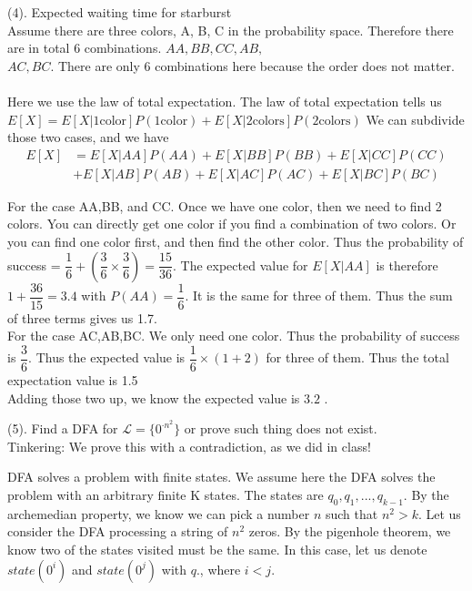 \documentclass{article}
\begin{document}
	\noindent (4). Expected waiting time for starburst\\
	Assume there are three colors, A, B, C in the probability space. Therefore there are in total 6 combinations. $AA,BB,CC,AB,$\\$AC,BC$. There are only 6 combinations here because the order does not matter.\\\\
	Here we use the law of total expectation. The law of total expectation tells us\\ $E[X] = E[X|\text{1color}]P(\text{1color})+E[X|\text{2colors}]P(\text{2colors})$
	We can subdivide those two cases, and we have
	\begin{align*}
		E[X] &= E[X|AA]P(AA)+E[X|BB]P(BB)+E[X|CC]P(CC)\\
		 &+E[X|AB]P(AB)+E[X|AC]P(AC)+E[X|BC]P(BC)
	\end{align*}

	For the case AA,BB, and CC. Once we have one color, then we need to find 2 colors. You can directly get one color if you find a combination of two colors. Or you can find one color first, and then find the other color. Thus the probability of success = $\dfrac{1}{6}+(\dfrac{3}{6} \times \dfrac{3}{6}) = \dfrac{15}{36}$. The expected value for $E[X|AA]$ is therefore $1 + \dfrac{36}{15} = 3.4$ with $P(AA) = \dfrac{1}{6}$. It is the same for three of them. Thus the sum of three terms gives us 1.7.\\
	
	For the case  AC,AB,BC. We only need one color. Thus the probability of success is $\dfrac{3}{6}$. Thus the expected value is $\dfrac{1}{6} \times(1+2)$ for three of them. Thus the total expectation value is 1.5\\
	
	Adding those two up, we know the expected value is $3.2$ .
	\newpage
	
	\noindent (5). Find a DFA for $\mathcal{L} = \{0^{\cdot n^2}\}$ or prove such thing does not exist.\\
	Tinkering: We prove this with a contradiction, as we did in class!
	
	DFA solves a problem with finite states. We assume here the DFA solves the problem with an arbitrary finite K states. The states are $q_0,q_1,...,q_{k-1}$. By the archemedian property, we know we can pick a number $n$ such that $n^2>k$. Let us consider the DFA processing a string of $n^2$ zeros. By the pigenhole theorem, we know two of the states visited must be the same. In this case, let us denote $state(0^i)$ and $state(0^j)$ with $q$., where $i<j$.
	
\end{document}
